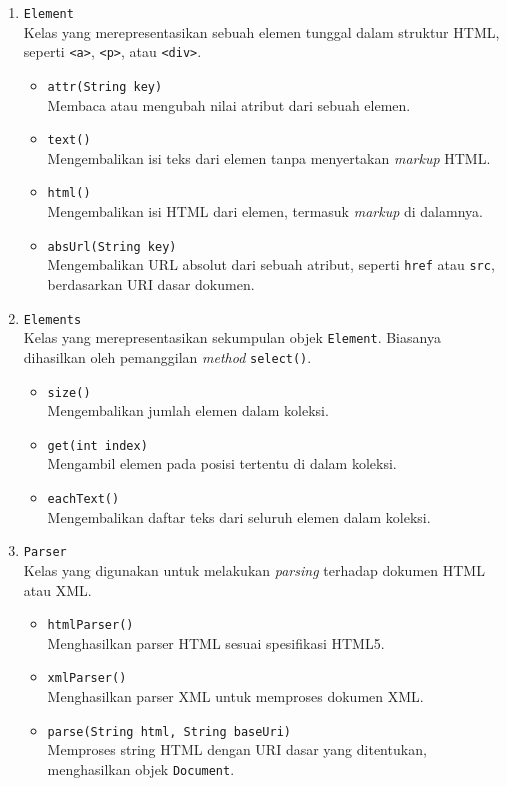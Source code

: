\begin{enumerate}[label=\alph*.]
    \item \texttt{Element}\\
    Kelas yang merepresentasikan sebuah elemen tunggal dalam struktur HTML, seperti \texttt{<a>}, \texttt{<p>}, atau \texttt{<div>}.
    \begin{itemize}
        \item \texttt{attr(String key)}\\
        Membaca atau mengubah nilai atribut dari sebuah elemen.
        \item \texttt{text()}\\
        Mengembalikan isi teks dari elemen tanpa menyertakan \textit{markup} HTML.
        \item \texttt{html()}\\
        Mengembalikan isi HTML dari elemen, termasuk \textit{markup} di dalamnya.
        \item \texttt{absUrl(String key)}\\
        Mengembalikan URL absolut dari sebuah atribut, seperti \texttt{href} atau \texttt{src}, berdasarkan URI dasar dokumen.
    \end{itemize}

    \item \texttt{Elements}\\
    Kelas yang merepresentasikan sekumpulan objek \texttt{Element}. Biasanya dihasilkan oleh pemanggilan \textit{method} \texttt{select()}.
    \begin{itemize}
        \item \texttt{size()}\\
        Mengembalikan jumlah elemen dalam koleksi.
        \item \texttt{get(int index)}\\
        Mengambil elemen pada posisi tertentu di dalam koleksi.
        \item \texttt{eachText()}\\
        Mengembalikan daftar teks dari seluruh elemen dalam koleksi.
    \end{itemize}

    \item \texttt{Parser}\\
    Kelas yang digunakan untuk melakukan \textit{parsing} terhadap dokumen HTML atau XML.
    \begin{itemize}
        \item \texttt{htmlParser()}\\
        Menghasilkan parser HTML sesuai spesifikasi HTML5.
        \item \texttt{xmlParser()}\\
        Menghasilkan parser XML untuk memproses dokumen XML.
        \item \texttt{parse(String html, String baseUri)}\\
        Memproses string HTML dengan URI dasar yang ditentukan, menghasilkan objek \texttt{Document}.
    \end{itemize}


\end{enumerate}
